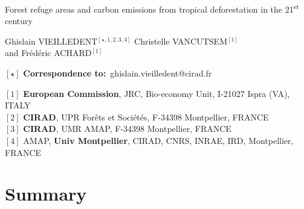 \documentclass[
  12pt,
]{article}
\author{}
\date{\vspace{-2.5em}}
\begin{document}
\renewcommand{\bibsection}{}  %

\begin{center}
  \LARGE{Forest refuge areas and carbon emissions from tropical deforestation in the 21\textsuperscript{st} century}
\end{center}

\vspace{1cm}

\begin{center}
  \large{
  Ghislain VIEILLEDENT$^{[\star, 1, 2, 3, 4]}$ \hspace{0.5cm} Christelle VANCUTSEM$^{[1]}$\\
  \vspace{0.5cm}
  and \hspace{0.5cm} Frédéric ACHARD$^{[1]}$
  }
\end{center}

\vspace{0.5cm}

\begin{center}
  $[\star]$ \textbf{Correspondence to:}~ghislain.vieilledent@cirad.fr\\
\end{center}

\vspace{0.5cm}

{\small
  \begin{flushleft}
    $[1]$ \textbf{European Commission}, JRC, Bio-economy Unit, I-21027 Ispra (VA), ITALY\\
    $[2]$ \textbf{CIRAD}, UPR Forêts et Sociétés, F-34398 Montpellier, FRANCE\\
    $[3]$ \textbf{CIRAD}, UMR AMAP, F-34398 Montpellier, FRANCE\\
    $[4]$ AMAP, \textbf{Univ Montpellier}, CIRAD, CNRS, INRAE, IRD, Montpellier, FRANCE\\
  \end{flushleft}}


\linenumbers

\hypertarget{summary}{%
\section*{Summary}\label{summary}}
\end{document}

